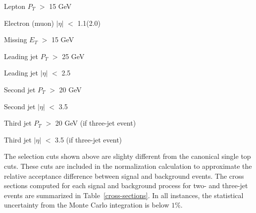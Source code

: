 \begin{myitemize}
\item Lepton $P_{T}$ $>$ 15 GeV
\item Electron (muon) $|\eta|$ $<$ 1.1(2.0)
\item Missing $E_{T}$ $>$ 15 GeV
\item Leading jet $P_{T}$ $>$ 25 GeV
\item Leading jet $|\eta|$ $<$ 2.5
\item Second jet $P_{T}$ $>$ 20 GeV
\item Second jet $|\eta|$ $<$ 3.5
\item Third jet $P_{T}$ $>$ 20 GeV (if three-jet event)
\item Third jet $|\eta|$ $<$ 3.5 (if three-jet event)
\end{myitemize}

The selection cuts shown above are slighty different from the
canonical single top cuts. These cuts are included in the
normalization calculation to approximate the relative acceptance
difference between signal and background events. The cross sections
computed for each signal and background process for two- and three-jet
events are summarized in Table~\ref{cross-sections}. In all instances,
the statistical uncertainty from the Monte Carlo integration is below
$1\%$.

